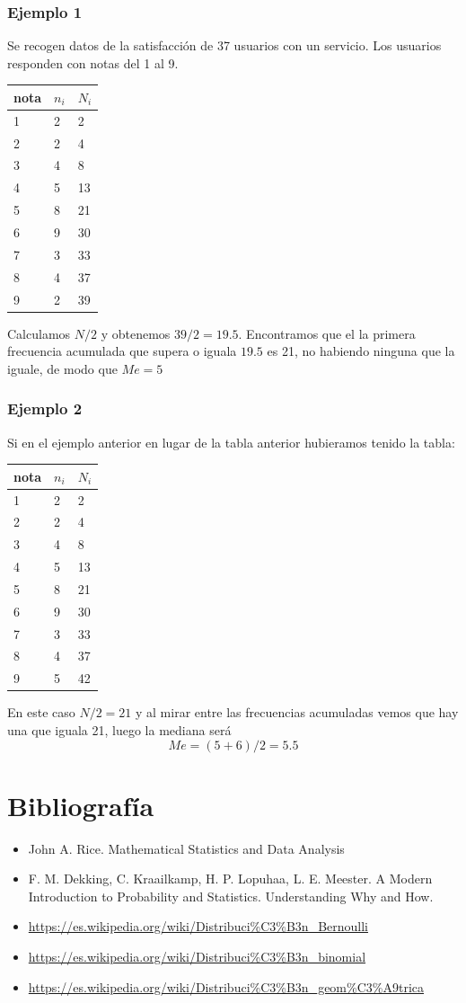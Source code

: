 \documentclass[
]{article}
\providecommand{\tightlist}{%
  \setlength{\itemsep}{0pt}\setlength{\parskip}{0pt}}
\begin{document}
\hypertarget{ejemplo-1-1}{%
\subsubsection{Ejemplo 1}\label{ejemplo-1-1}}

Se recogen datos de la satisfacción de 37 usuarios con un servicio. Los
usuarios responden con notas del 1 al 9.

\begin{longtable}[]{@{}lll@{}}
\toprule
nota & \(n_i\) & \(N_i\)\tabularnewline
\midrule
\endhead
1 & 2 & 2\tabularnewline
2 & 2 & 4\tabularnewline
3 & 4 & 8\tabularnewline
4 & 5 & 13\tabularnewline
5 & 8 & 21\tabularnewline
6 & 9 & 30\tabularnewline
7 & 3 & 33\tabularnewline
8 & 4 & 37\tabularnewline
9 & 2 & 39\tabularnewline
\bottomrule
\end{longtable}

Calculamos \(N/2\) y obtenemos \(39/2 = 19.5\). Encontramos que el la
primera frecuencia acumulada que supera o iguala \(19.5\) es 21, no
habiendo ninguna que la iguale, de modo que \(Me = 5\)

\hypertarget{ejemplo-2-1}{%
\subsubsection{Ejemplo 2}\label{ejemplo-2-1}}

Si en el ejemplo anterior en lugar de la tabla anterior hubieramos
tenido la tabla:

\begin{longtable}[]{@{}lll@{}}
\toprule
nota & \(n_i\) & \(N_i\)\tabularnewline
\midrule
\endhead
1 & 2 & 2\tabularnewline
2 & 2 & 4\tabularnewline
3 & 4 & 8\tabularnewline
4 & 5 & 13\tabularnewline
5 & 8 & 21\tabularnewline
6 & 9 & 30\tabularnewline
7 & 3 & 33\tabularnewline
8 & 4 & 37\tabularnewline
9 & 5 & 42\tabularnewline
\bottomrule
\end{longtable}

En este caso \(N/2= 21\) y al mirar entre las frecuencias acumuladas
vemos que hay una que iguala 21, luego la mediana será
\[ Me = (5+6)/2 = 5.5\]

\hypertarget{bibliografuxeda}{%
\section{Bibliografía}\label{bibliografuxeda}}

\begin{itemize}
\tightlist
\item
  John A. Rice. Mathematical Statistics and Data Analysis
\item
  F. M. Dekking, C. Kraailkamp, H. P. Lopuhaa, L. E. Meester. A Modern
  Introduction to Probability and Statistics. Understanding Why and How.
\item
  \url{https://es.wikipedia.org/wiki/Distribuci\%C3\%B3n_Bernoulli}
\item
  \url{https://es.wikipedia.org/wiki/Distribuci\%C3\%B3n_binomial}
\item
  \url{https://es.wikipedia.org/wiki/Distribuci\%C3\%B3n_geom\%C3\%A9trica}
\end{itemize}
\end{document}
